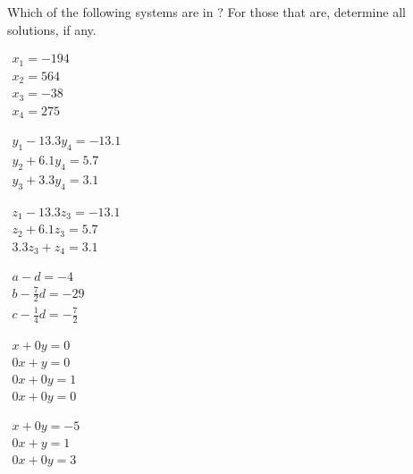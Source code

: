 \begin{exercise}  
Which of the following systems are in ?
For those that are, determine all solutions, if any.
\begin{Parts}
\item \(\begin{array}{l}
x_1=-194\\
x_2=564\\
x_3=-38\\
x_4=275
\end{array}\)

\item \(\begin{array}{l}
y_1-13.3y_4=-13.1\\
y_2+6.1y_4=5.7\\
y_3+3.3y_4=3.1
\end{array}\)

\item \(\begin{array}{l}
z_1-13.3z_3=-13.1\\
z_2+6.1z_3=5.7\\
3.3z_3+z_4=3.1
\end{array}\)

\item \(\begin{array}{l}a-d=-4\\
b-\frac72d=-29\\
c-\frac14d=-\frac72
\end{array}\)

\begin{reduce}
\item \(\begin{array}{l}x+0y=0\\
0x+y=0\\
0x+0y=1\\
0x+0y=0
\end{array}\)

\item \(\begin{array}{l}x+0y=-5\\
0x+y=1\\
0x+0y=3
\end{array}\)
\end{reduce}

%
%
\end{Parts}
\end{exercise}




